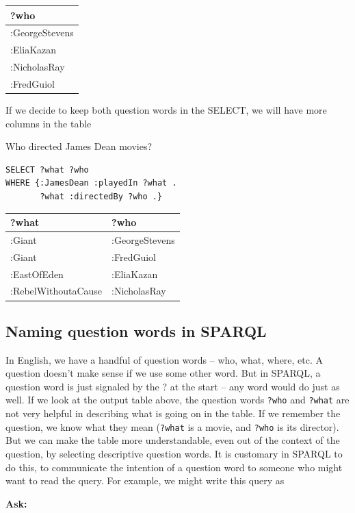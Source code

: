 \begin{tabular}{|l|}
\hline
?who\\
\hline
:GeorgeStevens\\
:EliaKazan\\
:NicholasRay\\
:FredGuiol\\
\hline
\end{tabular}

If we decide to keep both question words in the SELECT, we will have
more columns in the table

\begin{query}Who directed James Dean movies?\end{query}

\begin{lstlisting}
SELECT ?what ?who
WHERE {:JamesDean :playedIn ?what .
       ?what :directedBy ?who .}
\end{lstlisting}

\begin{tabular}{| l l | }
\hline
?what&?who\\
\hline
:Giant&:GeorgeStevens\\
:Giant&:FredGuiol\\
:EastOfEden&:EliaKazan\\
:RebelWithoutaCause&:NicholasRay\\
\hline
\end{tabular}

\subsection{Naming question words in SPARQL}

In English, we have a handful of question words -- who, what, where,
etc. A question doesn't make sense if we use some other word. But in
SPARQL, a question word is just signaled by the ? at the start -- any
word would do just as well. If we look at the output table above, the
question words \texttt{?who} and \texttt{?what} are not very helpful in describing what is
going on in the table. If we remember the question, we know what they
mean (\texttt{?what} is a movie, and \texttt{?who} is its director). But we can make the
table more understandable, even out of the context of the question, by
selecting descriptive question words. It is customary in SPARQL to do
this, to communicate the intention of a question word to someone who
might want to read the query. For example, we might write this query as

\textbf{\textbf{Ask:}}

